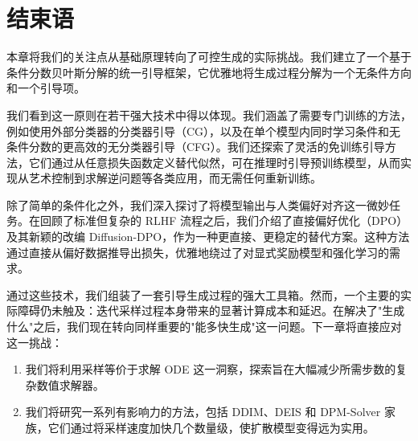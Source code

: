 \newpage
\section{结束语}\label{sec:ch8_cr}

本章将我们的关注点从基础原理转向了可控生成的实际挑战。我们建立了一个基于条件分数贝叶斯分解的统一引导框架，它优雅地将生成过程分解为一个无条件方向和一个引导项。

我们看到这一原则在若干强大技术中得以体现。我们涵盖了需要专门训练的方法，例如使用外部分类器的分类器引导（CG），以及在单个模型内同时学习条件和无条件分数的更高效的无分类器引导（CFG）。我们还探索了灵活的免训练引导方法，它们通过从任意损失函数定义替代似然，可在推理时引导预训练模型，从而实现从艺术控制到求解逆问题等各类应用，而无需任何重新训练。

除了简单的条件化之外，我们深入探讨了将模型输出与人类偏好对齐这一微妙任务。在回顾了标准但复杂的 RLHF 流程之后，我们介绍了直接偏好优化（DPO）及其新颖的改编 Diffusion-DPO，作为一种更直接、更稳定的替代方案。这种方法通过直接从偏好数据推导出损失，优雅地绕过了对显式奖励模型和强化学习的需求。


通过这些技术，我们组装了一套引导生成过程的强大工具箱。然而，一个主要的实际障碍仍未触及：迭代采样过程本身带来的显著计算成本和延迟。在解决了"生成什么"之后，我们现在转向同样重要的"能多快生成"这一问题。下一章将直接应对这一挑战：
\begin{enumerate}
    \item 我们将利用采样等价于求解 ODE 这一洞察，探索旨在大幅减少所需步数的复杂数值求解器。
    \item 我们将研究一系列有影响力的方法，包括 DDIM、DEIS 和 DPM-Solver 家族，它们通过将采样速度加快几个数量级，使扩散模型变得远为实用。
\end{enumerate}
